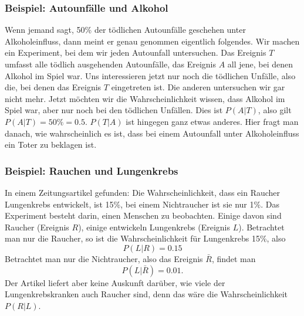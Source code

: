 \subsubsection{Beispiel: Autounfälle und Alkohol}
Wenn jemand sagt, 50\%
der tödlichen Autounfälle geschehen unter Alkoholeinfluss, dann
meint er genau genommen eigentlich folgendes.
Wir machen ein Experiment,
bei dem wir jeden Autounfall untersuchen.
Das Ereignis $T$ umfasst alle
tödlich ausgehenden Autounfälle, das Ereignis $A$ all jene, bei denen
Alkohol im Spiel war.
Uns interessieren jetzt nur noch die tödlichen
Unfälle, also die, bei denen das Ereignis $T$ eingetreten ist. 
Die anderen untersuchen wir gar nicht mehr.
Jetzt möchten wir die
Wahrscheinlichkeit wissen, dass Alkohol im Spiel war, aber nur noch
bei den tödlichen Unfällen.
Dies ist $P(A|T)$, also gilt
$P(A|T)=50\% = 0.5$.
$P(T|A)$ ist hingegen ganz etwas anderes.
Hier fragt man danach,
wie wahrscheinlich es ist, dass bei einem Autounfall unter Alkoholeinfluss
ein Toter zu beklagen ist.

\subsubsection{Beispiel: Rauchen und Lungenkrebs}
In einem Zeitungsartikel gefunden: Die Wahrscheinlichkeit, dass ein Raucher
Lungenkrebs entwickelt, ist 15\%, bei einem Nichtraucher ist sie nur 1\%.
Das Experiment besteht darin, einen Menschen zu beobachten.
Einige
davon sind Raucher (Ereignis $R$), einige entwickeln Lungenkrebs (Ereignis $L$).
Betrachtet man nur die Raucher, so ist die Wahrscheinlichkeit für
Lungenkrebs 15\%, also
\[
P(L|R)=0.15
\]
Betrachtet man nur die Nichtraucher, also das Ereignis $\bar R$, findet
man 
\[
P(L|\bar R)=0.01.
\]
Der Artikel liefert aber keine Auskunft darüber, wie viele der
Lungenkrebskranken auch Raucher sind, denn das wäre die Wahrscheinlichkeit
$P(R|L)$.

